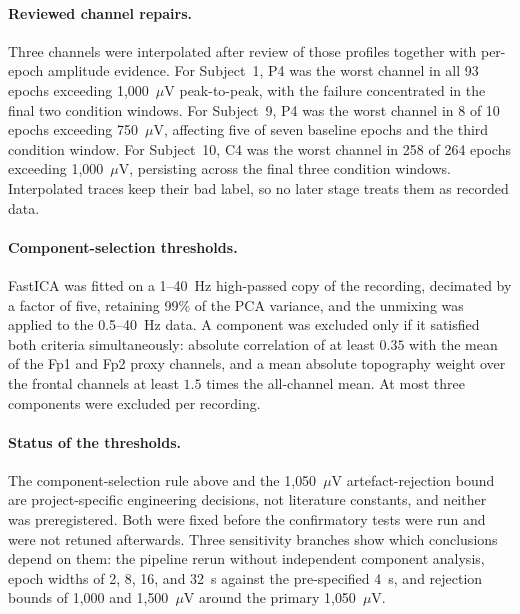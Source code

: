 \documentclass[english]{article}
\begin{document}
\paragraph{Reviewed channel repairs.}
Three channels were interpolated after review of those profiles together with per-epoch amplitude evidence. For Subject~1, P4 was the worst channel in all 93 epochs exceeding 1{,}000~$\mu$V peak-to-peak, with the failure concentrated in the final two condition windows. For Subject~9, P4 was the worst channel in 8 of 10 epochs exceeding 750~$\mu$V, affecting five of seven baseline epochs and the third condition window. For Subject~10, C4 was the worst channel in 258 of 264 epochs exceeding 1{,}000~$\mu$V, persisting across the final three condition windows. Interpolated traces keep their bad label, so no later stage treats them as recorded data.

\paragraph{Component-selection thresholds.}
FastICA was fitted on a 1--40~Hz high-passed copy of the recording, decimated by a factor of five, retaining 99\% of the PCA variance, and the unmixing was applied to the 0.5--40~Hz data. A component was excluded only if it satisfied both criteria simultaneously: absolute correlation of at least \(0.35\) with the mean of the Fp1 and Fp2 proxy channels, and a mean absolute topography weight over the frontal channels at least \(1.5\) times the all-channel mean. At most three components were excluded per recording.

\paragraph{Status of the thresholds.}
The component-selection rule above and the 1{,}050~$\mu$V artefact-rejection bound are project-specific engineering decisions, not literature constants, and neither was preregistered. Both were fixed before the confirmatory tests were run and were not retuned afterwards. Three sensitivity branches show which conclusions depend on them: the pipeline rerun without independent component analysis, epoch widths of 2, 8, 16, and 32~s against the pre-specified 4~s, and rejection bounds of 1{,}000 and 1{,}500~$\mu$V around the primary 1{,}050~$\mu$V.

\end{document}
